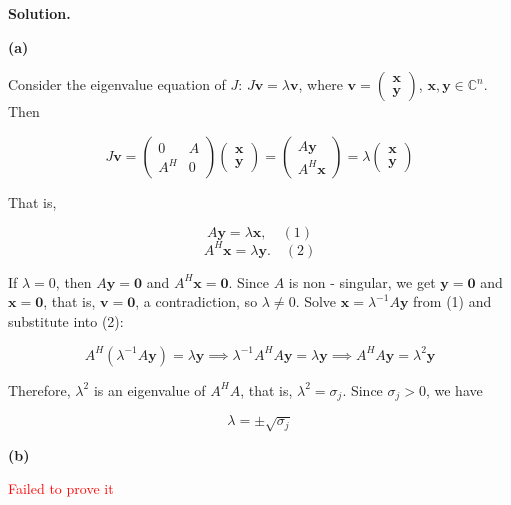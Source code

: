 \documentclass[12pt, a4paper, oneside]{ctexart}
\newenvironment{solution}{\par\noindent\textbf{Solution. }}{\par}
\begin{document}
\begin{solution}

\textbf{(a)} 

Consider the eigenvalue equation of $ J $: $ J\mathbf{v} = \lambda\mathbf{v} $, where $ \mathbf{v}=\begin{pmatrix}\mathbf{x}\\\mathbf{y}\end{pmatrix} $, $ \mathbf{x}, \mathbf{y}\in\mathbb{C}^n$. Then

$$
J\mathbf{v}=\begin{pmatrix}0&A\\A^H&0\end{pmatrix}\begin{pmatrix}\mathbf{x}\\\mathbf{y}\end{pmatrix}=\begin{pmatrix}A\mathbf{y}\\A^H\mathbf{x}\end{pmatrix}=\lambda\begin{pmatrix}\mathbf{x}\\\mathbf{y}\end{pmatrix}
$$

That is,

$$
A\mathbf{y}=\lambda\mathbf{x},\quad(1)
$$
$$
A^H\mathbf{x}=\lambda\mathbf{y}.\quad(2)
$$

If $ \lambda = 0 $, then $ A\mathbf{y}=\mathbf{0} $ and $ A^H\mathbf{x}=\mathbf{0} $. Since $ A $ is non - singular, we get $ \mathbf{y}=\mathbf{0} $ and $ \mathbf{x}=\mathbf{0} $, that is, $ \mathbf{v}=\mathbf{0} $, a contradiction, so $ \lambda\neq 0 $. Solve $ \mathbf{x}=\lambda^{- 1}A\mathbf{y} $ from (1) and substitute into (2):

$$
A^H(\lambda^{- 1}A\mathbf{y})=\lambda\mathbf{y}\implies \lambda^{- 1}A^H A\mathbf{y}=\lambda\mathbf{y}\implies A^H A\mathbf{y}=\lambda^2\mathbf{y}
$$

Therefore, $ \lambda^2 $ is an eigenvalue of $ A^H A $, that is, $ \lambda^2= \sigma_j $. Since $ \sigma_j>0 $, we have

$$
\lambda=\pm \sqrt{\sigma_j}
$$

\vspace{12pt}

\textbf{(b)} 

\textcolor{red}{Failed to prove it}


\end{solution}
\end{document}
